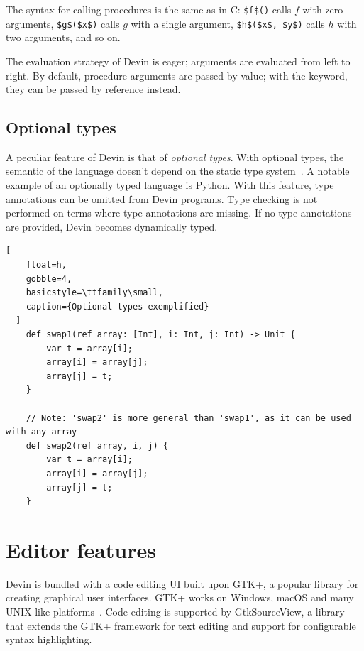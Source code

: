 \documentclass[UdineBachThesis,american,11pt]{PhdThesis}
\begin{document}
  The syntax for calling procedures is the same as in C:
  \lstinline[mathescape]@$f$()@ calls $f$ with zero arguments,
  \lstinline[mathescape]@$g$($x$)@ calls $g$ with a single argument,
  \lstinline[mathescape]@$h$($x$, $y$)@ calls $h$ with two arguments, and so on.

  The evaluation strategy of Devin is eager; arguments are evaluated from left
  to right. By default, procedure arguments are passed by value; with the
  \lstinline@ref@ keyword, they can be passed by reference instead.

  \subsection{Optional types}

  A peculiar feature of Devin is that of \emph{optional types}. With optional
  types, the semantic of the language doesn't depend on the static type
  system~\cite{bracha_2004}. A notable example of an optionally typed language
  is Python. With this feature, type annotations can be omitted from Devin
  programs. Type checking is not performed on terms where type annotations are
  missing. If no type annotations are provided, Devin becomes dynamically typed.

  \begin{lstlisting}[
    float=h,
    gobble=4,
    basicstyle=\ttfamily\small,
    caption={Optional types exemplified}
  ]
    def swap1(ref array: [Int], i: Int, j: Int) -> Unit {
        var t = array[i];
        array[i] = array[j];
        array[j] = t;
    }

    // Note: 'swap2' is more general than 'swap1', as it can be used with any array
    def swap2(ref array, i, j) {
        var t = array[i];
        array[i] = array[j];
        array[j] = t;
    }
  \end{lstlisting}

  \section{Editor features}
  \label{section:editorfeatures}

  Devin is bundled with a code editing UI built upon GTK+, a popular library for
  creating graphical user interfaces. GTK+ works on Windows, macOS and many
  UNIX-like platforms~\cite{gtk+}. Code editing is supported by GtkSourceView, a
  library that extends the GTK+ framework for text editing and support for
  configurable syntax highlighting.
\end{document}
